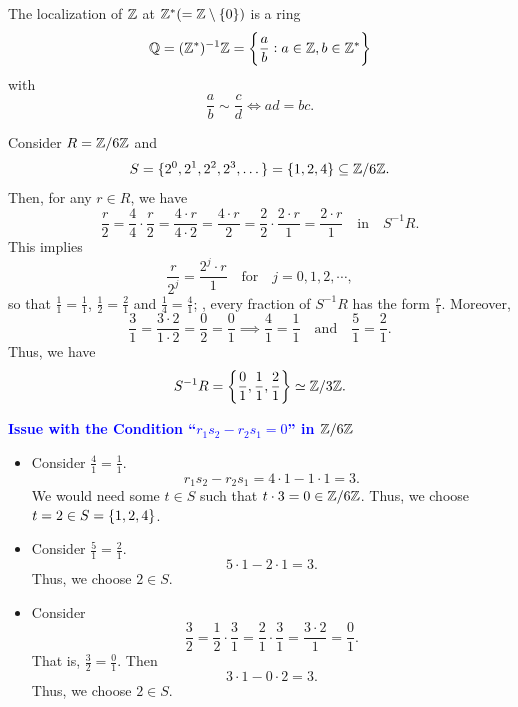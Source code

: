 \documentclass[11pt,openany]{article}
\begin{document}
\vspace{24pt}
\begin{example*}
	The localization of $\mathbb{Z}$ at $\mathbb{Z}^*(=\mathbb{Z}\setminus\set{0})$ is a ring \[
	\mathbb{Q}=(\mathbb{Z}^*)^{-1}\mathbb{Z}=\set{\frac{a}{b}:a\in\mathbb{Z},b\in\mathbb{Z}^*}
	\] with \[
	\frac{a}{b}\sim\frac{c}{d}\iff ad=bc.
	\]
\end{example*}
\vspace{12pt}
\begin{note}
	Consider $R=\mathbb{Z}/6\mathbb{Z}$ and \[
	S=\{2^0,2^1,2^2,2^3,\dots\}=\set{1,2,4}\subseteq\mathbb{Z}/6\mathbb{Z}.
	\] Then, for any $r\in R$, we have \[
	\frac{r}{2}=\frac{4}{4}\cdot\frac{r}{2}=\frac{4\cdot r}{4\cdot 2}=\frac{4\cdot r}{2}=\frac{2}{2}\cdot\frac{2\cdot r}{1}=\frac{2\cdot r}{1}\quad\text{in}\quad S^{-1}R.
	\] This implies \[
	\frac{r}{2^j}=\frac{2^j\cdot r}{1}\quad\text{for}\quad j=0,1,2,\cdots,
	\] so that $\displaystyle\frac{1}{1}=\frac{1}{1}$, $\displaystyle\frac{1}{2}=\frac{2}{1}$ and $\displaystyle\frac{1}{4}=\frac{4}{1}$; \ie, every fraction of $S^{-1}R$ has the form $\displaystyle\frac{r}{1}$. Moreover, \[
	\frac{3}{1}=\frac{3\cdot 2}{1\cdot 2}=\frac{0}{2}=\frac{0}{1}\implies\frac{4}{1}=\frac{1}{1}\quad\text{and}\quad\frac{5}{1}=\frac{2}{1}.
	\] Thus, we have \[
	S^{-1}R=\set{\frac{0}{1},\frac{1}{1},\frac{2}{1}}\simeq\mathbb{Z}/3\mathbb{Z}.
	\]
	
	\vspace{24pt}
	\noindent
	\textcolor{blue}{\bf Issue with the Condition ``$r_1s_2-r_2s_1=0$'' in $\mathbb{Z}/6\mathbb{Z}$}\\
	\begin{itemize}
		\item Consider $\displaystyle\frac{4}{1}=\frac{1}{1}$. \[
		r_1s_2-r_2s_1=4\cdot 1-1\cdot 1 = 3.
		\] We would need some $t\in S$ such that $t\cdot 3=0\in \mathbb{Z}/6\mathbb{Z}$. Thus, we choose $t=2\in S=\set{1,2,4}$.\vspace{12pt}
		\item Consider $\displaystyle\frac{5}{1}=\frac{2}{1}$. \[
		5\cdot 1-2\cdot 1 = 3.
		\] Thus, we choose $2\in S$.\vspace{12pt}
		\item Consider \[
		\frac{3}{2}=\frac{1}{2}\cdot\frac{3}{1}=\frac{2}{1}\cdot\frac{3}{1}=\frac{3\cdot 2}{1}=\frac{0}{1}.
		\] That is, $\displaystyle\frac{3}{2}=\frac{0}{1}$. Then \[
		3\cdot 1-0\cdot 2 = 3.
		\] Thus, we choose $2\in S$.
	\end{itemize}
\end{note}
\end{document}

